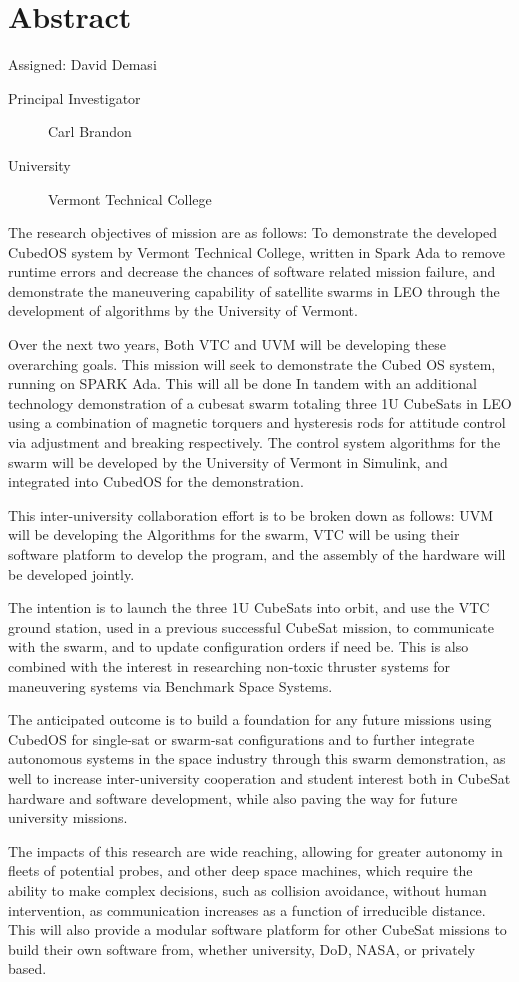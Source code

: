 \section{Abstract}
Assigned: David Demasi \cite{brandon:2008}

\begin{description}
\item[Principal Investigator] Carl Brandon
\item[University] Vermont Technical College
\end{description}

The research objectives of mission are as follows: To demonstrate
the developed CubedOS system by Vermont Technical College, written in
Spark Ada to remove runtime errors and decrease the chances of
software related mission failure, and demonstrate the maneuvering
capability of satellite swarms in LEO through the development of
algorithms by the University of Vermont.

Over the next two years, Both VTC and UVM will be developing these
overarching goals. This mission will seek to demonstrate the Cubed OS
system, running on SPARK Ada. This will all be done In tandem with an
additional technology demonstration of a cubesat swarm totaling three
1U CubeSats in LEO using a combination of magnetic torquers and
hysteresis rods for attitude control via adjustment and breaking
respectively. The control system algorithms for the swarm will be
developed by the University of Vermont in Simulink, and integrated
into CubedOS for the demonstration.

This inter-university collaboration effort is to be broken down as
follows: UVM will be developing the Algorithms for the swarm, VTC will
be using their software platform to develop the program, and the
assembly of the hardware will be developed jointly.

The intention is to launch the three 1U CubeSats into orbit, and use
the VTC ground station, used in a previous successful CubeSat mission,
to communicate with the swarm, and to update configuration orders if
need be. This is also combined with the interest in researching
non-toxic thruster systems for maneuvering systems via Benchmark Space
Systems.
	
The anticipated outcome is to build a foundation for any future
missions using CubedOS for single-sat or swarm-sat configurations and
to further integrate autonomous systems in the space industry through
this swarm demonstration, as well to increase inter-university
cooperation and student interest both in CubeSat hardware and software
development, while also paving the way for future university missions.
	
The impacts of this research are wide reaching, allowing for greater
autonomy in fleets of potential probes, and other deep space machines,
which require the ability to make complex decisions, such as collision
avoidance, without human intervention, as communication increases as a
function of irreducible distance. This will also provide a modular
software platform for other CubeSat missions to build their own
software from, whether university, DoD, NASA, or privately based.
